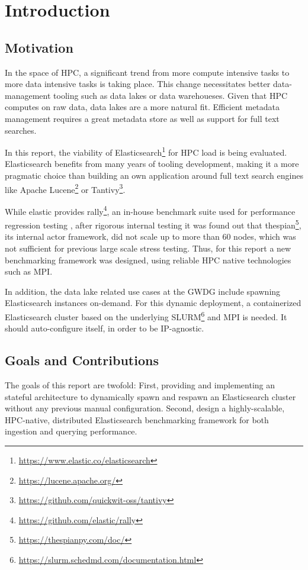 \section{Introduction}
\subsection{Motivation}
In the space of \ac{HPC}, a significant trend from more compute intensive tasks to more data intensive tasks is taking place. This change necessitates better data-management tooling such as data lakes or data warehoueses. Given that \ac{HPC} computes on raw data, data lakes are a more natural fit. Efficient metadata management requires a great metadata store as well as support for full text searches.

In this report, the viability of Elasticsearch\footnote{\url{https://www.elastic.co/elasticsearch}} for \ac{HPC} load is being evaluated. Elasticsearch benefits from many years of tooling development, making it a more pragmatic choice than building an own application around full text search engines like Apache Lucene\footnote{\url{https://lucene.apache.org/}} or Tantivy\footnote{\url{https://github.com/quickwit-oss/tantivy}}.

While elastic provides rally\footnote{\url{https://github.com/elastic/rally}}, an in-house benchmark suite used for performance regression testing \cite{es_benchmarking}, after rigorous internal testing it was found out that thespian\footnote{\url{https://thespianpy.com/doc/}}, its internal actor framework, did not scale up to more than 60 nodes, which was not sufficient for previous large scale stress testing. Thus, for this report a new benchmarking framework was designed, using reliable \ac{HPC} native technologies such as \ac{MPI}.

In addition, the data lake related use cases at the GWDG include spawning Elasticsearch instances on-demand. For this dynamic deployment, a containerized Elasticsearch cluster based on the underlying SLURM\footnote{\url{https://slurm.schedmd.com/documentation.html}} and \ac{MPI} is needed. It should auto-configure itself, in order to be IP-agnostic.
\subsection{Goals and Contributions}
The goals of this report are twofold: First, providing and implementing an stateful architecture to dynamically spawn and respawn an Elasticsearch cluster without any previous manual configuration. Second, design a highly-scalable, \ac{HPC}-native, distributed Elasticsearch benchmarking framework for both ingestion and querying performance. 

